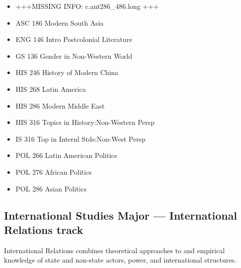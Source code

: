 \documentclass[
  letterpaper,
]{scrbook}
\providecommand{\tightlist}{%
  \setlength{\itemsep}{0pt}\setlength{\parskip}{0pt}}
\begin{document}
\begin{enumerate}
  \begin{itemize}
  \tightlist
  \item
    +++MISSING INFO: c.ant286\_486.long +++
  \item
    ASC 186 Modern South Asia
  \item
    ENG 146 Intro Postcolonial Literature
  \item
    GS 136 Gender in Non-Western World
  \item
    HIS 246 History of Modern China
  \item
    HIS 268 Latin America
  \item
    HIS 286 Modern Middle East
  \item
    HIS 316 Topics in History:Non-Western Persp
  \item
    IS 316 Top in Internl Stds:Non-West Persp
  \item
    POL 266 Latin American Politics
  \item
    POL 276 African Politics
  \item
    POL 286 Asian Politics
  \end{itemize}
\end{enumerate}

\subsection{International Studies Major --- International Relations
track}\label{international-studies-major-international-relations-track}

International Relations combines theoretical approaches to and empirical
knowledge of state and non-state actors, power, and international
structures.
\end{document}
